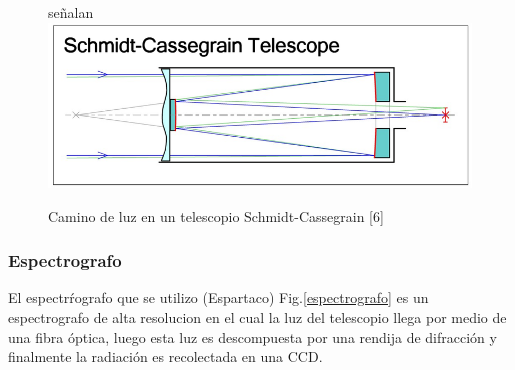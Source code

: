 \documentclass[Proceedings]{ascelike}
\begin{document}
\begin{figure}señalan
\centering
\includegraphics[scale=0.4]{SCT2.jpg}
\caption{Camino de luz en un telescopio Schmidt-Cassegrain [6] \label{la}}
\end{figure}


\subsubsection{Espectrografo}

El espectr\'rografo que se utilizo (Espartaco) Fig.\ref{espectrografo} es un espectrografo de alta resolucion en el cual la luz del telescopio llega por medio de una fibra \'optica, luego esta luz es descompuesta por una rendija de difracci\'on y finalmente la radiaci\'on es recolectada en una CCD.
\end{document}
